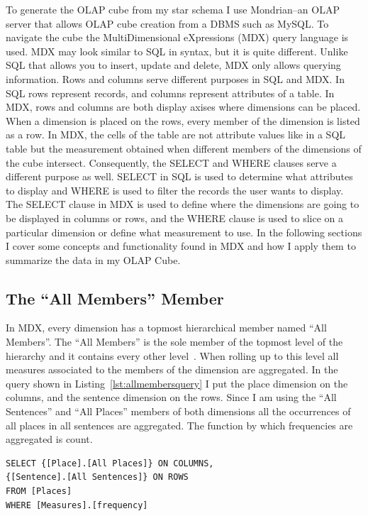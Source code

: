 To generate the OLAP cube from my star schema I use Mondrian--an OLAP server that allows OLAP cube creation from a DBMS such as MySQL. To navigate the cube the
MultiDimensional eXpressions (MDX) query language is used. MDX may look similar to SQL in syntax, but it is quite different. Unlike SQL that allows you to
insert, update and delete, MDX only allows querying information. Rows and columns serve different purposes in SQL and MDX. In SQL rows represent records, and
columns represent attributes of a table. In MDX, rows and columns are both display axises where dimensions can be placed. When a dimension is placed on the
rows, every member of the dimension is listed as a row. In MDX, the cells of the table are not attribute values like in a SQL table but the measurement
obtained when different members of the dimensions of the cube intersect. Consequently, the SELECT and WHERE clauses serve a different purpose as well. SELECT
in SQL is used to determine what attributes to display and WHERE is used to filter the records the user wants to display. The SELECT clause in MDX is used to
define where the dimensions are going to be displayed in columns or rows, and the WHERE clause is used to slice on a particular dimension or define what
measurement to use. In the following sections I cover some concepts and functionality found in MDX and how I apply them to summarize the data in my OLAP Cube.

\subsection{The ``All Members'' Member} %
\label{sub:the_all_member_}

In MDX, every dimension has a topmost hierarchical member named ``All Members''. The ``All Members'' is the sole member of the topmost level of the hierarchy
and it contains every other level~\cite{Whitehorn:2005:FTM:1098716}. When rolling up to this level all measures associated to the members of the dimension are
aggregated. In the query shown in Listing~\ref{lst:allmembersquery} I put the place dimension on the columns, and the sentence dimension on the rows. Since I
am using the ``All Sentences'' and ``All Places'' members of both dimensions all the occurrences of all places in all sentences are aggregated. The function by
which frequencies are aggregated is count.

\begin{lstlisting}[label=lst:allmembersquery,caption=MDX query using ``All Members'']
SELECT {[Place].[All Places]} ON COLUMNS, 
{[Sentence].[All Sentences]} ON ROWS 
FROM [Places] 
WHERE [Measures].[frequency] 
\end{lstlisting}

